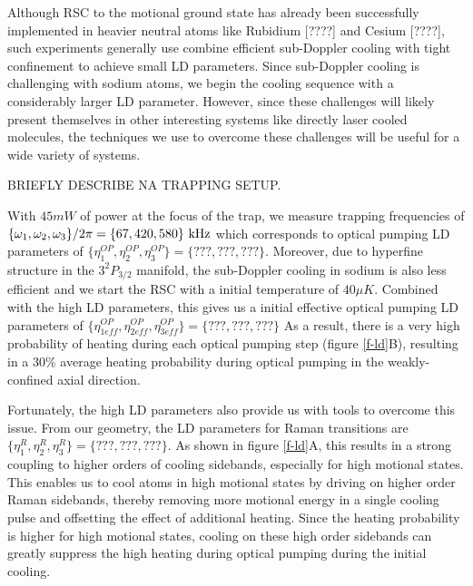 \documentclass[aps,prl,twocolumn,groupedaddress]{revtex4-1}
\begin{document}
Although RSC to the motional ground state has already been successfully
implemented in heavier neutral atoms like Rubidium [????]
and Cesium [????], such experiments generally use combine efficient sub-Doppler cooling
with tight confinement to achieve small LD parameters.
Since sub-Doppler cooling is challenging with sodium atoms, we begin the cooling sequence with a considerably larger LD parameter.  However, since these challenges will likely present themselves in other interesting systems like directly laser cooled molecules, the techniques we use to overcome these challenges will be useful for a wide variety of systems.

BRIEFLY DESCRIBE NA TRAPPING SETUP.


With $45mW$ of power at the focus of the trap, we measure trapping frequencies of
$\{\omega_1,\omega_2,\omega_3\}/2\pi = \{67, 420, 580\}\ \text{\text{kHz}}$
which corresponds to optical pumping LD parameters of
$\{\eta^{OP}_1,\eta^{OP}_2,\eta^{OP}_3\} = \{???, ???, ???\}$.
Moreover, due to hyperfine structure in the $3^2P_{3/2}$ manifold,
the sub-Doppler cooling in sodium is also less efficient and we start the
RSC with a initial temperature of $40\mu K$. Combined with the high LD
parameters, this gives us a initial effective optical pumping LD parameters of
$\{\eta^{OP}_{1eff},\eta^{OP}_{2eff},\eta^{OP}_{3eff}\} = \{???, ???, ???\}$
As a result, there is a very high probability of heating during each optical pumping step
(figure \ref{f-ld}B), resulting in a $30\%$ average heating probability during optical pumping
in the weakly-confined axial direction. 

Fortunately, the high LD parameters also
provide us with tools to overcome this issue. From our geometry, the LD parameters for
Raman transitions are $\{\eta^R_{1},\eta^R_{2},\eta^R_{3}\} = \{???, ???, ???\}$. As shown in
figure \ref{f-ld}A, this results in a strong coupling to higher orders
of cooling sidebands, especially for high motional states.
This enables us to cool atoms in high motional states by driving on higher order Raman sidebands,
thereby removing more motional energy in a single cooling pulse and offsetting the effect of
additional heating. Since the heating probability is higher for high motional states,
cooling on these high order sidebands can greatly suppress the high heating during
optical pumping during the initial cooling. 
\end{document}
